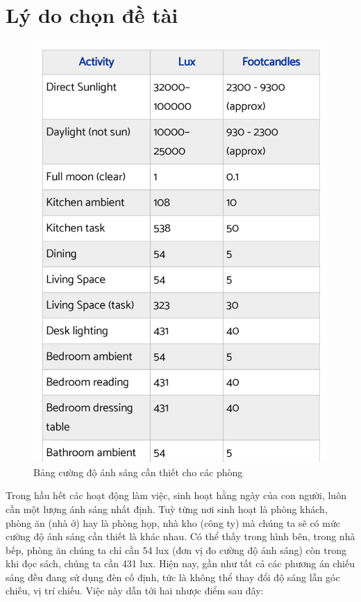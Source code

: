 
\section{Lý do chọn đề tài}

\begin{figure}
    \includegraphics[scale=0.8]{Chapters/Chapter1/Images/Cuongdosangcanthiet}
    \caption{Bảng cường độ ánh sáng cần thiết cho các phòng}
    \label{fig:cuongdoanhsang}
\end{figure}

Trong hầu hết các hoạt động làm việc, sinh hoạt hằng ngày của con người, luôn cần một lượng ánh sáng nhất định. Tuỳ từng nơi sinh hoạt là phòng khách, phòng ăn (nhà ở) hay là phòng họp, nhà kho (công ty) mà chúng ta sẽ có mức cường độ ánh sáng cần thiết là khác nhau. Có thể thấy trong hình bên, trong nhà bếp, phòng ăn chúng ta chỉ cần 54 lux (đơn vị đo cường độ ánh sáng) còn trong khi đọc sách, chúng ta cần 431 lux. Hiện nay, gần như tất cả các phương án chiếu sáng đều đang sử dụng đèn cố định, tức là không thể thay đổi độ sáng lẫn góc chiếu, vị trí chiếu. Việc này dẫn tới hai nhược điểm sau đây:


